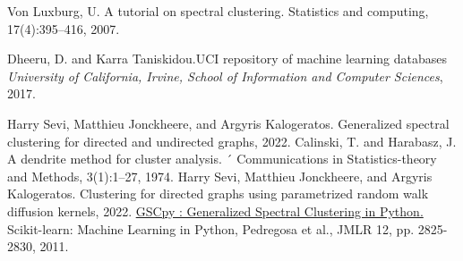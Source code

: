 \documentclass[a4paper,12pt]{article}
\theoremstyle{definition}
\theoremstyle{plain}
\begin{document}
\newpage
\begin{thebibliography}{9}
Von Luxburg, U. A tutorial on spectral clustering. Statistics and
computing, 17(4):395–416, 2007.

Dheeru, D. and Karra Taniskidou.UCI repository of machine learning databases \textit{University of California, Irvine, School of
	Information and Computer Sciences}, 2017.

Harry Sevi, Matthieu Jonckheere, and Argyris Kalogeratos.
Generalized spectral clustering for directed and undirected graphs,
2022.
Calinski, T. and Harabasz, J. A dendrite method for cluster analysis. ´
Communications in Statistics-theory and Methods, 3(1):1–27,
1974.
Harry Sevi, Matthieu Jonckheere, and Argyris Kalogeratos.
Clustering for directed graphs using parametrized random walk diffusion kernels, 2022.
\href{https://github.com/Malik-Hacini/GSCpy}{GSCpy : Generalized Spectral Clustering in Python.}
Scikit-learn: Machine Learning in Python, Pedregosa et al., JMLR 12, pp. 2825-2830, 2011.
\end{thebibliography}
\end{document}
